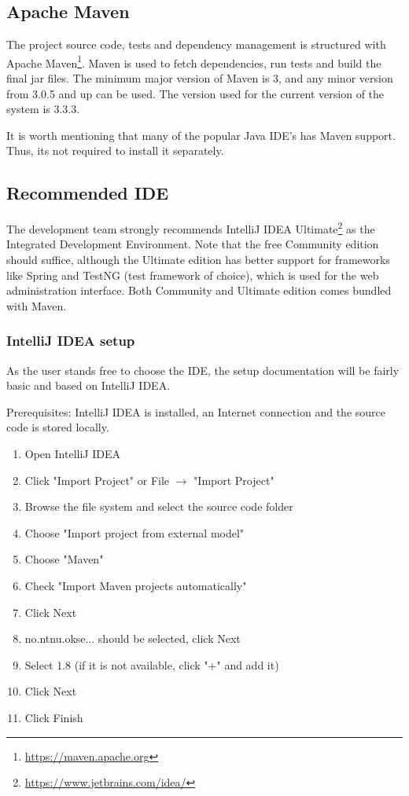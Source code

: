 \subsection{Apache Maven}
The project source code, tests and dependency management is structured with Apache Maven\footnote{\url{https://maven.apache.org}}. Maven is used to fetch dependencies, run tests and build the final jar files. The minimum major version of Maven is 3, and any minor version from 3.0.5 and up can be used. The version used for the current version of the system is 3.3.3.

It is worth mentioning that many of the popular Java IDE's has Maven support. Thus, its not required to install it separately.

\subsection{Recommended IDE}
The development team strongly recommends IntelliJ IDEA Ultimate\footnote{\url{https://www.jetbrains.com/idea/}} as the Integrated Development Environment. Note that the free Community edition should suffice, although the Ultimate edition has better support for frameworks like Spring and TestNG (test framework of choice), which is used for the web administration interface. Both Community and Ultimate edition comes bundled with Maven.

\subsubsection{IntelliJ IDEA setup}
As the user stands free to choose the IDE, the setup documentation will be fairly basic and based on IntelliJ IDEA.

Prerequisites: IntelliJ IDEA is installed, an Internet connection and the source code is stored locally.

\begin{enumerate}
\setlength{\itemsep}{0cm}%
    \item Open IntelliJ IDEA
    \item Click "Import Project" or File $\rightarrow$ "Import Project"
    \item Browse the file system and select the source code folder
    \item Choose "Import project from external model"
    \item Choose "Maven"
    \item Check "Import Maven projects automatically"
    \item Click Next
    \item no.ntnu.okse... should be selected, click Next
    \item Select 1.8 (if it is not available, click "+" and add it)
    \item Click Next
    \item Click Finish
\end{enumerate}

